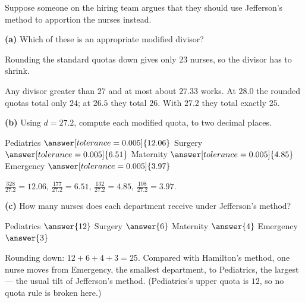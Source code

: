 \documentclass[12pt]{ximera}
\begin{document}
\begin{problem}
Suppose someone on the hiring team argues that they should use Jefferson's method to
apportion the nurses instead.

\begin{prompt}
\textbf{(a)} Which of these is an appropriate modified divisor?

\begin{multipleChoice}
\end{multipleChoice}

\begin{hint}
Rounding the standard quotas down gives only $23$ nurses, so the divisor has to shrink.
\end{hint}

\begin{feedback}
Any divisor greater than $27$ and at most about $27.33$ works. At $28.0$ the rounded
quotas total only $24$; at $26.5$ they total $26$. With $27.2$ they total exactly $25$.
\end{feedback}
\end{prompt}

\begin{prompt}
\textbf{(b)} Using $d=27.2$, compute each modified quota, to two decimal places.

Pediatrics $\answer[tolerance=0.005]{12.06}$ \quad Surgery $\answer[tolerance=0.005]{6.51}$
\quad Maternity $\answer[tolerance=0.005]{4.85}$ \quad Emergency $\answer[tolerance=0.005]{3.97}$

\begin{feedback}
$\frac{328}{27.2}=12.06$, $\frac{177}{27.2}=6.51$, $\frac{132}{27.2}=4.85$,
$\frac{108}{27.2}=3.97$.
\end{feedback}
\end{prompt}

\begin{prompt}
\textbf{(c)} How many nurses does each department receive under Jefferson's method?

Pediatrics $\answer{12}$ \quad Surgery $\answer{6}$ \quad Maternity $\answer{4}$ \quad
Emergency $\answer{3}$

\begin{feedback}
Rounding down: $12+6+4+3=25$. \checkmark Compared with Hamilton's method, one nurse
moves from Emergency, the smallest department, to Pediatrics, the largest --- the usual
tilt of Jefferson's method. (Pediatrics's upper quota is $12$, so no quota rule is
broken here.)
\end{feedback}
\end{prompt}
\end{problem}
\end{document}
